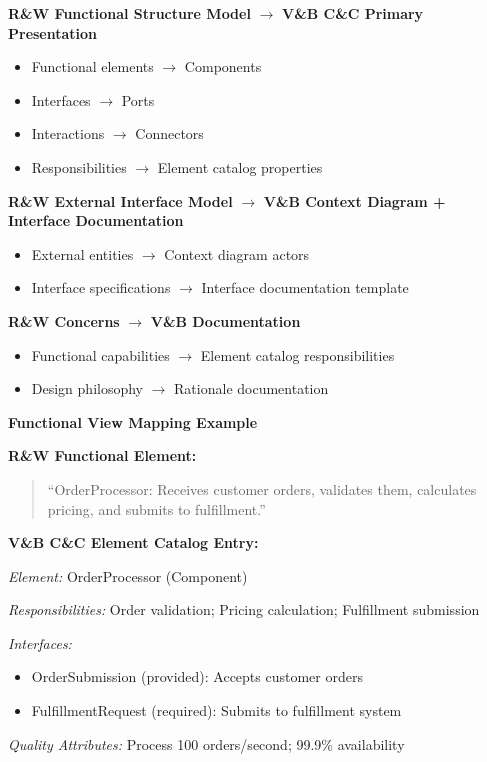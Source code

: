\documentclass[11pt]{article}
\begin{document}
\begin{mappingbox}

\textbf{R\&W Functional Structure Model} $\rightarrow$ \textbf{V\&B C\&C Primary Presentation}
\begin{itemize}[nosep]
    \item Functional elements $\rightarrow$ Components
    \item Interfaces $\rightarrow$ Ports
    \item Interactions $\rightarrow$ Connectors
    \item Responsibilities $\rightarrow$ Element catalog properties
\end{itemize}

\textbf{R\&W External Interface Model} $\rightarrow$ \textbf{V\&B Context Diagram + Interface Documentation}
\begin{itemize}[nosep]
    \item External entities $\rightarrow$ Context diagram actors
    \item Interface specifications $\rightarrow$ Interface documentation template
\end{itemize}

\textbf{R\&W Concerns} $\rightarrow$ \textbf{V\&B Documentation}
\begin{itemize}[nosep]
    \item Functional capabilities $\rightarrow$ Element catalog responsibilities
    \item Design philosophy $\rightarrow$ Rationale documentation
\end{itemize}
\end{mappingbox}

\begin{example}
\textbf{Functional View Mapping Example}

\textbf{R\&W Functional Element:}
\begin{quote}
``OrderProcessor: Receives customer orders, validates them, calculates pricing, and submits to fulfillment.''
\end{quote}

\textbf{V\&B C\&C Element Catalog Entry:}

\textit{Element:} OrderProcessor (Component)

\textit{Responsibilities:} Order validation; Pricing calculation; Fulfillment submission

\textit{Interfaces:}
\begin{itemize}[nosep]
    \item OrderSubmission (provided): Accepts customer orders
    \item FulfillmentRequest (required): Submits to fulfillment system
\end{itemize}

\textit{Quality Attributes:} Process 100 orders/second; 99.9\% availability
\end{example}
\end{document}
